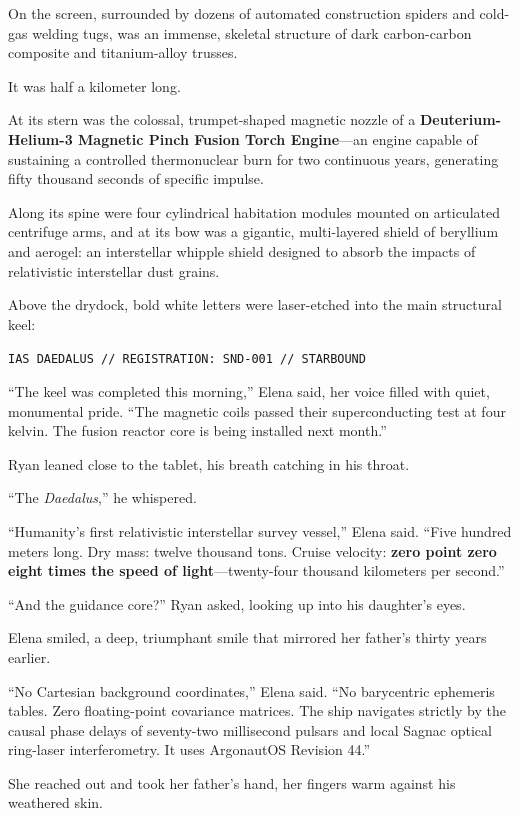 \documentclass[12pt,twoside,openright]{book}
\begin{document}
On the screen, surrounded by dozens of automated construction spiders
and cold-gas welding tugs, was an immense, skeletal structure of dark
carbon-carbon composite and titanium-alloy trusses.

It was half a kilometer long.

At its stern was the colossal, trumpet-shaped magnetic nozzle of a
\textbf{Deuterium-Helium-3 Magnetic Pinch Fusion Torch Engine}---an
engine capable of sustaining a controlled thermonuclear burn for two
continuous years, generating fifty thousand seconds of specific impulse.

Along its spine were four cylindrical habitation modules mounted on
articulated centrifuge arms, and at its bow was a gigantic,
multi-layered shield of beryllium and aerogel: an interstellar whipple
shield designed to absorb the impacts of relativistic interstellar dust
grains.

Above the drydock, bold white letters were laser-etched into the main
structural keel:

\passthrough{\lstinline!IAS DAEDALUS // REGISTRATION: SND-001 // STARBOUND!}

``The keel was completed this morning,'' Elena said, her voice filled
with quiet, monumental pride. ``The magnetic coils passed their
superconducting test at four kelvin. The fusion reactor core is being
installed next month.''

Ryan leaned close to the tablet, his breath catching in his throat.

``The \emph{Daedalus},'' he whispered.

``Humanity's first relativistic interstellar survey vessel,'' Elena
said. ``Five hundred meters long. Dry mass: twelve thousand tons. Cruise
velocity: \textbf{zero point zero eight times the speed of
light}---twenty-four thousand kilometers per second.''

``And the guidance core?'' Ryan asked, looking up into his daughter's
eyes.

Elena smiled, a deep, triumphant smile that mirrored her father's thirty
years earlier.

``No Cartesian background coordinates,'' Elena said. ``No barycentric
ephemeris tables. Zero floating-point covariance matrices. The ship
navigates strictly by the causal phase delays of seventy-two millisecond
pulsars and local Sagnac optical ring-laser interferometry. It uses
ArgonautOS Revision 44.''

She reached out and took her father's hand, her fingers warm against his
weathered skin.
\end{document}
